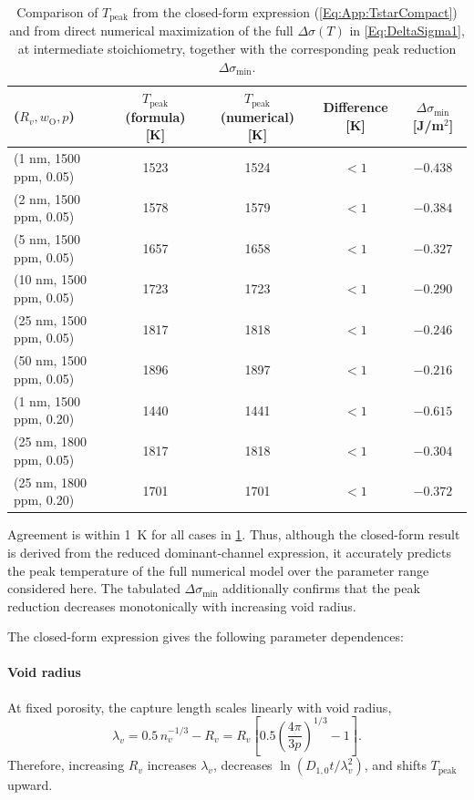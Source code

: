 \documentclass[preprint,12pt,sort&compress]{elsarticle}
\newcommand{\?}{\stackrel{?}{=}}
\begin{document}
\begin{table}[h!]
\centering
\scriptsize
\caption{Comparison of $T_\text{peak}$ from the closed-form expression (\cref{Eq:App:TstarCompact}) and from direct numerical maximization of the full $\Delta\sigma(T)$ in \cref{Eq:DeltaSigma1}, at intermediate stoichiometry, together with the corresponding peak reduction $\Delta\sigma_\text{min}$.}
\label{Tab:App:Tpeak}
\begin{tabular}{lcccc}
\hline
($R_v, w_\text{O}, p$) & $T_\text{peak}$ (formula) [K] & $T_\text{peak}$ (numerical) [K] & Difference [K] & $\Delta\sigma_\text{min}$ [J/m$^2$] \\
\hline
(1 nm, 1500 ppm, 0.05) & 1523 & 1524 & $<1$ & $-0.438$ \\
(2 nm, 1500 ppm, 0.05) & 1578 & 1579 & $<1$ & $-0.384$ \\
(5 nm, 1500 ppm, 0.05) & 1657 & 1658 & $<1$ & $-0.327$ \\
(10 nm, 1500 ppm, 0.05) & 1723 & 1723 & $<1$ & $-0.290$ \\
(25 nm, 1500 ppm, 0.05) & 1817 & 1818 & $<1$ & $-0.246$ \\
(50 nm, 1500 ppm, 0.05) & 1896 & 1897 & $<1$ & $-0.216$ \\
(1 nm, 1500 ppm, 0.20) & 1440 & 1441 & $<1$ & $-0.615$ \\
(25 nm, 1800 ppm, 0.05) & 1817 & 1818 & $<1$ & $-0.304$ \\
(25 nm, 1800 ppm, 0.20) & 1701 & 1701 & $<1$ & $-0.372$ \\
\hline
\end{tabular}
\end{table}

Agreement is within 1~K for all cases in \cref{Tab:App:Tpeak}. Thus, although the closed-form result is derived from the reduced dominant-channel expression, it accurately predicts the peak temperature of the full numerical model over the parameter range considered here. The tabulated $\Delta\sigma_\text{min}$ additionally confirms that the peak reduction decreases monotonically with increasing void radius.

The closed-form expression gives the following parameter dependences:
\paragraph{Void radius} At fixed porosity, the capture length scales linearly with void radius,
\begin{equation}
\lambda_v = 0.5\,n_v^{-1/3}-R_v = R_v \left[ 0.5 \left( \frac{4\pi}{3p} \right)^{1/3} - 1 \right].
\end{equation}
Therefore, increasing $R_v$ increases $\lambda_v$, decreases $\ln(D_{1,0}t/\lambda_v^2)$, and shifts $T_\text{peak}$ upward.
\end{document}
